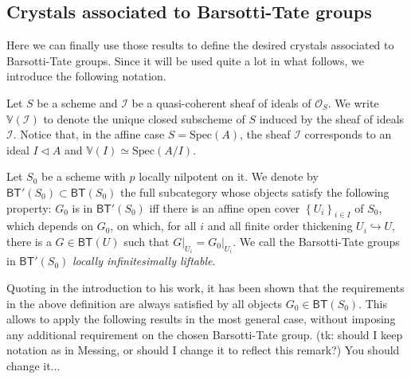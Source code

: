 \subsection{Crystals associated to Barsotti-Tate groups}
Here we can finally use those results to define the desired crystals
associated to Barsotti-Tate groups.
Since it will be used quite a lot in what follows,
we introduce the following notation.


\begin{ntt}
	Let $S$ be a scheme and $\mathcal{I}$ be a quasi-coherent sheaf of
	ideals of $\mathcal{O}_{ S }$.
	We write $\mathbb{V}(\mathcal{I})$ to denote the unique
	closed subscheme of $S$ induced by the sheaf of ideals $\mathcal{I}$.
	Notice that, in the affine case $S = \mathrm{Spec}(A)$,
	the sheaf $\mathcal{I}$ corresponds to an ideal $I \triangleleft A$
	and $\mathbb{V}(I) \simeq \mathrm{Spec}(A/I)$.
\end{ntt} 


\begin{defn}\label{defn:LILBTG}
	Let $S_0$ be a scheme with $p$ locally nilpotent on it.
	We denote by $\mathsf{BT}'(S_0) \subset \mathsf{BT}(S_0)$ 
	the full subcategory whose objects satisfy the following property:
	$G_0$ is in $\mathsf{BT}'(S_0)$ iff
	there is an affine open cover $\left\{ U_i \right\}_{i \in I}$ of $S_0$, which depends on $G_0$, 
	on which, for all $i$ and all finite order thickening $U_i \hookrightarrow U$,
	there is a $G \in \mathsf{BT}(U)$ such that
	$\left.G\right|_{U_i} = \left.G_0\right|_{U_i}$.
	We call the Barsotti-Tate groups in $\mathsf{BT}'(S_0)$
	{\em locally infinitesimally liftable}.
\end{defn}


\begin{rem}[]\label{rem:LocallyLiftableBTG}
	Quoting \cite{Messing} in the introduction to his work, it has been shown
	that the requirements in the above definition are always satisfied by 
	all objects $G_0 \in \mathsf{BT}(S_0)$.
	This allows to apply the following results in the most general case,
	without imposing any additional requirement on the chosen Barsotti-Tate group.
	(tk: should I keep notation as in Messing, or should I change it to reflect this remark?)	
	You should change it...
\end{rem}



